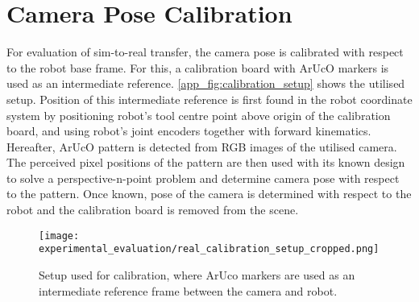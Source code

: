 \section{Camera Pose Calibration}\label{app:camera_pose_calibration}

For evaluation of sim-to-real transfer, the camera pose is calibrated with respect to the robot base frame. For this, a calibration board with ArUcO markers \cite{garrido-jurado_automatic_2014} is used as an intermediate reference. \autoref{app_fig:calibration_setup} shows the utilised setup. Position of this intermediate reference is first found in the robot coordinate system by positioning robot's tool centre point above origin of the calibration board, and using robot's joint encoders together with forward kinematics. Hereafter, ArUcO pattern is detected from RGB images of the utilised camera. The perceived pixel positions of the pattern are then used with its known design to solve a perspective-n-point problem and determine camera pose with respect to the pattern. Once known, pose of the camera is determined with respect to the robot and the calibration board is removed from the scene.

\setcounter{figure}{0}
\begin{figure}[ht]
    \centering
    \texttt{[image: experimental\_evaluation/real\_calibration\_setup\_cropped.png]}
    \caption{Setup used for calibration, where ArUco markers are used as an intermediate reference frame between the camera and robot.}
    \label{app_fig:calibration_setup}
\end{figure}
